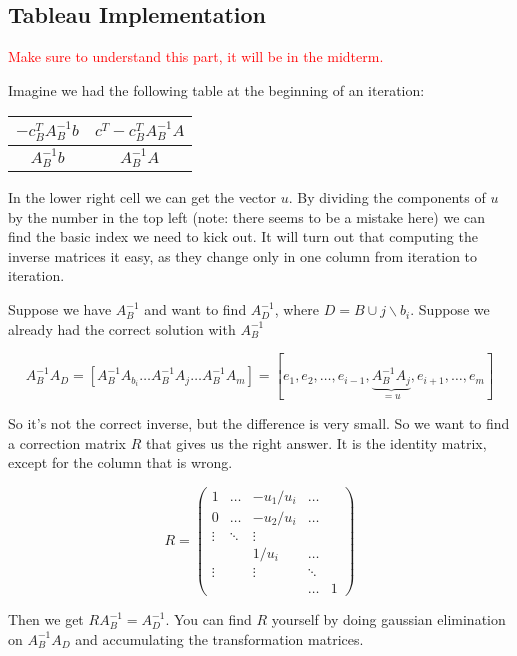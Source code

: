 \subsection*{Tableau Implementation}

\textcolor{red}{Make sure to understand this part, it will be in the midterm.}

Imagine we had the following table at the beginning of an iteration:

\begin{center}
\begin{tabular}{c|c}
$-c^{T}_BA_B^{-1}b$ & $c^{T}-c^{T}_BA_B^{-1}A$\\\hline
$A^{-1}_B b$ & $A_B^{-1}A$
\end{tabular}
\end{center}

In the lower right cell we can get the vector $u$. By dividing the components of $u$ by the number in the top left (note: there seems to be a mistake here) we can find the basic index we need to kick out. It will turn out that computing the inverse matrices it easy, as they change only in one column from iteration to iteration.

Suppose we have $A_B^{-1}$ and want to find $A_D^{-1}$, where $D=B\cup j \backslash b_i$. Suppose we already had the correct solution with $A_B^{-1}$ 

\[A_B^{-1}A_D = \left[ A_B^{-1}A_{b_i}\ldots A_B^{-1}A_j\ldots A_B^{-1}A_m\right] = \left[ e_1,e_2, \ldots, e_{i-1}, \underbrace{A_B^{-1}A_j}_{=u}, e_{i+1},\ldots, e_m\right]\]

So it's not the correct inverse, but the difference is very small. So we want to find a correction matrix $R$ that gives us the right answer. It is the identity matrix, except for the column that is wrong.

\[R= \begin{pmatrix} %
1 & \ldots & -u_1/u_i & \ldots \\
0 & \ldots & -u_2/u_i & \ldots \\
\vdots & \ddots & \vdots \\
& & 1/u_i & \ldots\\
\vdots & &\vdots &\ddots\\
& & & \ldots & 1
\end{pmatrix}\]

Then we get $RA_B^{-1} = A_D^{-1}$. You can find $R$ yourself by doing gaussian elimination on $A_B^{-1}A_D$ and accumulating the transformation matrices.

